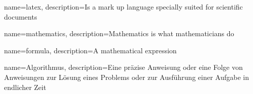 {
        name=latex,
        description={Is a mark up language specially suited for 
scientific documents}
}

{
        name=mathematics,
        description={Mathematics is what mathematicians do}
}

{
        name=formula,
        description={A mathematical expression}
}

{
        name=Algorithmus,
        description={Eine präzise Anweisung oder eine Folge von Anweisungen zur Lösung eines Problems oder zur Ausführung einer Aufgabe in endlicher Zeit}
}














\printglossaries